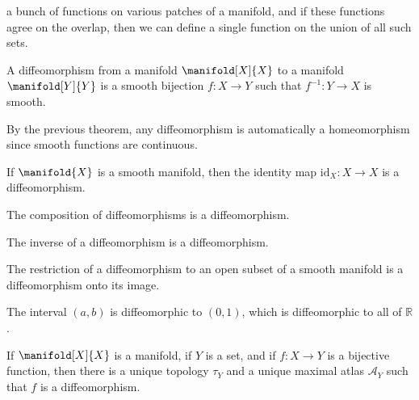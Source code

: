         a bunch of functions on various patches of a manifold, and if these
        functions agree on the overlap, then we can define a single function
        on the union of all such sets.
        \begin{definition}
            A diffeomorphism from a manifold $\manifold[X]{X}$ to a manifold
            $\manifold[Y]{Y}$ is a smooth bijection $f:X\rightarrow{Y}$
            such that $f^{\minus{1}}:Y\rightarrow{X}$ is smooth.
        \end{definition}
        By the previous theorem, any diffeomorphism is automatically a
        homeomorphism since smooth functions are continuous.
        \begin{theorem}
            If $\manifold{X}$ is a smooth manifold, then the identity map
            $\textrm{id}_{X}:X\rightarrow{X}$ is a diffeomorphism.
        \end{theorem}
        \begin{theorem}
            The composition of diffeomorphisms is a diffeomorphism.
        \end{theorem}
        \begin{theorem}
            The inverse of a diffeomorphism is a diffeomorphism.
        \end{theorem}
        \begin{theorem}
            The restriction of a diffeomorphism to an open subset of a
            smooth manifold is a diffeomorphism onto its image.
        \end{theorem}
        \begin{example}
            The interval $(a,b)$ is diffeomorphic to $(0,1)$, which is
            diffeomorphic to all of $\mathbb{R}$.
        \end{example}
        \begin{theorem}
            If $\manifold[X]{X}$ is a manifold, if $Y$ is a set, and if
            $f:X\rightarrow{Y}$ is a bijective function, then there is a
            unique topology $\tau_{Y}$ and a unique maximal atlas
            $\mathcal{A}_{Y}$ such that $f$ is a diffeomorphism.
        \end{theorem}
